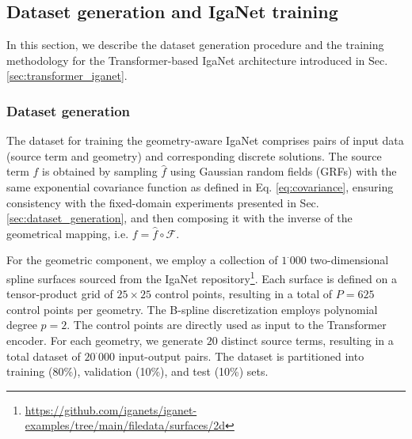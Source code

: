\documentclass{article}
\theoremstyle{plain}
\numberwithin{equation}{section}
\begin{document}
\subsection{Dataset generation and IgaNet training}\label{sec:dataset_training_transformer}
In this section, we describe the dataset generation procedure and the training methodology for the Transformer-based IgaNet architecture introduced in Sec. \ref{sec:transformer_iganet}.

\subsubsection{Dataset generation}
The dataset for training the geometry-aware IgaNet comprises pairs of input data (source term and geometry) and corresponding discrete solutions. The source term $f$ is obtained by sampling $\hat{f}$  using Gaussian random fields (GRFs) with the same exponential covariance function as defined in Eq. \eqref{eq:covariance}, ensuring consistency with the fixed-domain experiments presented in Sec. \ref{sec:dataset_generation}, and then composing it with the inverse of the geometrical mapping, i.e. $f=\hat{f}\circ \mathcal{F}$.

For the geometric component, we employ a collection of $1^{\cdot}000$ two-dimensional spline surfaces sourced from the IgaNet repository\footnote{\url{https://github.com/iganets/iganet-examples/tree/main/filedata/surfaces/2d}}. Each surface is defined on a tensor-product grid of $25 \times 25$ control points, resulting in a total of $P = 625$ control points per geometry. The B-spline discretization employs polynomial degree $p=2$. The control points are directly used as input to the Transformer encoder.
For each geometry, we generate $20$ distinct source terms, resulting in a total dataset of $20^{\cdot}000$ input-output pairs. The dataset is partitioned into training (80\%), validation (10\%), and test (10\%) sets.
\end{document}
